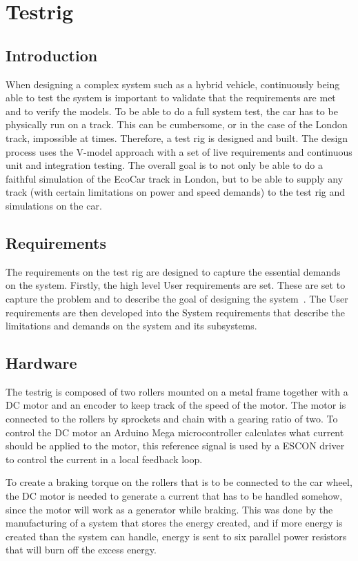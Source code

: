 \chapter{Testrig}
\section{Introduction}
When designing a complex system such as a hybrid vehicle, continuously being
able to test the system is important to validate that the requirements are met
and to verify the models. To be able to do a full system test, the car has to be
physically run on a track. This can be cumbersome, or in the case of the London
track, impossible at times. Therefore, a test rig is designed and built. The
design process uses the V-model approach with a set of live requirements and
continuous unit and integration testing. The overall goal is to not only be able
to do a faithful simulation of the EcoCar track in London, but to be able to
supply any track (with certain limitations on power and speed demands) to the
test rig and simulations on the car.

\section{Requirements}
The requirements on the test rig are designed to capture the essential demands
on the system. Firstly, the high level User requirements are set. These are set
to capture the problem and to describe the goal of designing the
system~\cite{ibm_req}. The User requirements are then developed into the System
requirements that describe the limitations and demands on the system and its
subsystems.

\section{Hardware}

The testrig is composed of two rollers mounted on a metal frame together with a
DC motor and an encoder to keep track of the speed
of the motor. The motor is connected to the rollers by sprockets and chain with
a gearing ratio of two. To control the DC motor an Arduino Mega microcontroller
calculates what current should be applied to the motor, this reference signal
is used by a ESCON driver to control the current in a local feedback loop.

To create a braking torque on the rollers that is to be connected to the car wheel, the DC motor is needed to generate a current
that has to be handled somehow, since the motor will work as
a generator while braking. This was done by the manufacturing of a system that
stores the energy created, and if more energy is created than the system can
handle, energy is sent to six parallel power resistors that will burn off the
excess energy. 

